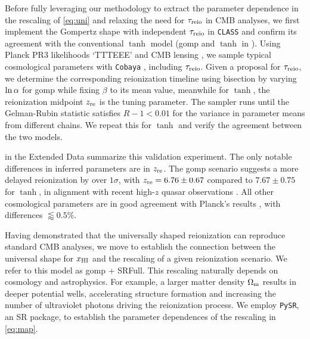 Before fully leveraging our methodology to extract the parameter
dependence in the rescaling of \cref{eq:uni} and relaxing the need for
$\tau_{\mathrm{reio}}$ in CMB analyses, we first implement the Gompertz shape with
independent $\tau_{\mathrm{reio}}$ in \texttt{CLASS} and confirm its agreement
with the conventional $\tanh$ model (gomp and $\tanh$ in
).
Using Planck PR3 likelihoods `TTTEEE' \cite{Planck2020c} and CMB lensing
\cite{Planck2020d}, we sample typical cosmological parameters with
\texttt{Cobaya} \cite{Torrado2020}, including $\tau_{\mathrm{reio}}$.
Given a proposal for $\tau_{\mathrm{reio}}$, we determine the corresponding
reionization timeline using bisection by varying $\ln\alpha$ for gomp
while fixing $\beta$ to its mean value,
meanwhile for $\tanh$, the reionization midpoint $z_{\mathrm{re}}$ is the tuning
parameter.
The sampler runs until the Gelman-Rubin statistic \cite{Gelman1992}
satisfies $R - 1 < 0.01$ for the variance in parameter means from different chains.
We repeat this for $\tanh$ and verify the agreement between the two
models.

 in the Extended Data summarize this
validation experiment.
The only notable differences in inferred parameters are in $z_{\mathrm{re}}$.
The gomp scenario suggests a more delayed reionization by over
$1\sigma$, with $z_{\mathrm{re}} = 6.76 \pm 0.67$ compared to $7.67 \pm 0.75$ for
$\tanh$, in alignment with recent high-$z$ quasar observations
\cite{Keating2020}.
All other cosmological parameters are in good agreement with Planck's
results \cite{Planck2020a}, with differences $\lessapprox 0.5 \%$.

Having demonstrated that the universally shaped reionization can
reproduce standard CMB analyses, we move to establish the connection
between the universal shape for $x_{\mathrm{HI}}$ and the rescaling of a given
reionization scenario.
We refer to this model as gomp + SRFull.
This rescaling naturally depends on cosmology and astrophysics.
For example, a larger matter density $\Omega_\mathrm{m}$ results in deeper
potential wells, accelerating structure formation and increasing the
number of ultraviolet photons driving the reionization process.
We employ \texttt{PySR}, an SR package, to establish the parameter
dependences of the rescaling in \cref{eq:map}.

